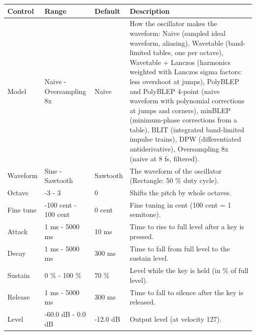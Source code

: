 \begin{tabular}{p{}p{}p{}p{}}
\hline
Control & Range & Default & Description \\
\hline
Model & Naive - Oversampling 8x & Naive & How the oscillator makes the waveform: Naive (sampled ideal waveform, aliasing), Wavetable (band-limited tables, one per octave), Wavetable + Lanczos (harmonics weighted with Lanczos sigma factors: less overshoot at jumps), PolyBLEP and PolyBLEP 4-point (naive waveform with polynomial corrections at jumps and corners), minBLEP (minimum-phase corrections from a table), BLIT (integrated band-limited impulse trains), DPW (differentiated antiderivative), Oversampling 8x (naive at 8 fs, filtered). \\
Waveform & Sine - Sawtooth & Sawtooth & The waveform of the oscillator (Rectangle: 50 \% duty cycle). \\
Octave & -3 - 3 & 0 & Shifts the pitch by whole octaves. \\
Fine tune & -100 cent - 100 cent & 0 cent & Fine tuning in cent (100 cent = 1 semitone). \\
Attack & 1 ms - 5000 ms & 10 ms & Time to rise to full level after a key is pressed. \\
Decay & 1 ms - 5000 ms & 300 ms & Time to fall from full level to the sustain level. \\
Sustain & 0 \% - 100 \% & 70 \% & Level while the key is held (in \% of full level). \\
Release & 1 ms - 5000 ms & 300 ms & Time to fall to silence after the key is released. \\
Level & -60.0 dB - 0.0 dB & -12.0 dB & Output level (at velocity 127). \\
\hline
\end{tabular}
